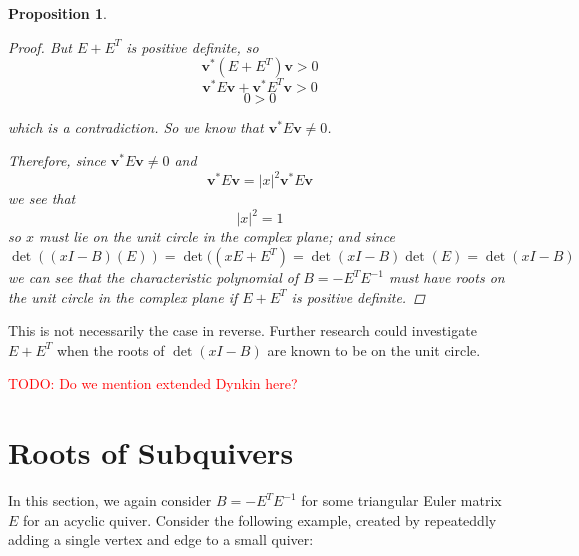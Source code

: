 \documentclass{amsart}
\theoremstyle{theorem}
\theoremstyle{theorem*}
\newtheorem{proposition}[theorem]{Proposition}
\theoremstyle{definition}
\begin{document}
\begin{proposition}
\begin{proof}
    But $E + E^T$ is positive definite, so 
    $$\textbf{v}^* (E + E^T) \textbf{v} > 0$$
    $$\textbf{v}^* E \textbf{v} + \textbf{v}^* E^T \textbf{v} > 0$$
    $$0 > 0$$

    which is a contradiction. So we know that
    $\textbf{v}^* E \textbf{v} \neq 0$.

    Therefore, since $\textbf{v}^* E \textbf{v} \neq 0$ and 
    $$\textbf{v}^* E \textbf{v} = |x|^2 \textbf{v}^* E \textbf{v}$$
    we see that 
    $$|x|^2 = 1$$
    so $x$ must lie on the unit circle in the complex plane; and since
    $$\det((xI - B)(E)) = \det((xE + E^T) =
    \det(xI - B)\det(E) = \det(xI - B)$$
    we can see that the characteristic polynomial
    of $B = -E^T E^{-1}$ must have roots on the unit circle
    in the complex plane if $E + E^T$ is positive definite.  
    \end{proof}
\end{proposition}

This is not necessarily the case in reverse. Further research could investigate
$E + E^T$ when the roots of $\det(xI - B)$ are known to be on the unit circle.

\textcolor{red}{TODO: Do we mention extended Dynkin here?}

\section{Roots of Subquivers}

In this section, we again consider $B = - E^T E^{-1}$ for some
triangular Euler matrix $E$ for an acyclic quiver. Consider the following
example, created by repeateddly adding a single vertex and edge to a small
quiver:
\end{document}

